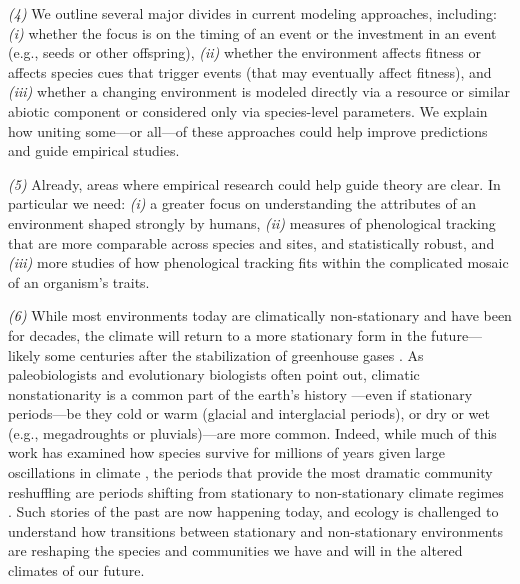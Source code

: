 \documentclass[11pt,letterpaper]{article}
\begin{document}
\emph{(4)}  We outline several major divides in current modeling approaches, including: \emph{(i)} whether the focus is on the timing of an event or the investment in an event (e.g., seeds or other offspring), \emph{(ii)} whether the environment affects fitness or affects species cues that trigger events (that may eventually affect fitness), and \emph{(iii)} whether a changing environment is modeled directly via a resource or similar abiotic component or considered only via species-level parameters. We explain how uniting some---or all---of these approaches could help improve predictions and guide empirical studies. 

\emph{(5)} Already, areas where empirical research could help guide theory are clear. In particular we need: \emph{(i)} a greater focus on understanding the attributes of an environment shaped strongly by humans, \emph{(ii)} measures of phenological tracking that are more comparable across species and sites, and statistically robust, and \emph{(iii)} more studies of how phenological tracking fits within the complicated mosaic of an organism's traits.

\emph{(6)}  While most environments today are climatically non-stationary and have been for decades, the climate will return to a more stationary form in the future---likely some centuries after the stabilization of greenhouse gases \citep{ipcc2013ch12}. As paleobiologists and evolutionary biologists often point out, climatic nonstationarity is a common part of the earth's history \citep{Jansson:2002nz}---even if stationary periods---be they cold or warm (glacial and interglacial periods), or dry or wet (e.g., megadroughts or pluvials)---are more common. Indeed, while much of this work has examined how species survive for millions of years given large oscillations in climate \citep{provan2008}, the periods that provide the most dramatic community reshuffling are periods shifting from stationary to non-stationary climate regimes \citep{vrba1980,vrba1985}. Such stories of the past are now happening today, and ecology is challenged to understand how transitions between stationary and non-stationary environments are reshaping the species and communities we have and will in the altered climates of our future.

\end{document}

